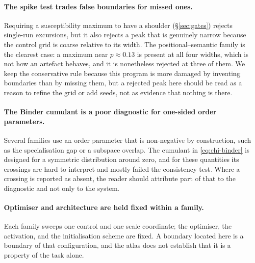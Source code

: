 \paragraph{The spike test trades false boundaries for missed ones.}
Requiring a susceptibility maximum to have a shoulder (\S\ref{sec:gates})
rejects single-run excursions, but it also rejects a peak that is genuinely
narrow because the control grid is coarse relative to its width. The
positional--semantic family is the clearest case: a maximum near $p\approx0.13$
is present at all four widths, which is not how an artefact behaves, and it is
nonetheless rejected at three of them. We keep the conservative rule because
this program is more damaged by inventing boundaries than by missing them, but
a rejected peak here should be read as a reason to refine the grid or add
seeds, not as evidence that nothing is there.

\paragraph{The Binder cumulant is a poor diagnostic for one-sided order
parameters.} Several families use an order parameter that is non-negative by
construction, such as the specialisation gap or a subspace overlap. The
cumulant in \eqref{eq:chi-binder} is designed for a symmetric distribution
around zero, and for these quantities its crossings are hard to interpret and
mostly failed the consistency test. Where a crossing is reported as absent, the
reader should attribute part of that to the diagnostic and not only to the
system.

\paragraph{Optimiser and architecture are held fixed within a family.}
Each family sweeps one control and one scale coordinate; the optimiser, the
activation, and the initialisation scheme are fixed. A boundary located here is
a boundary of that configuration, and the atlas does not establish that it is a
property of the task alone.
